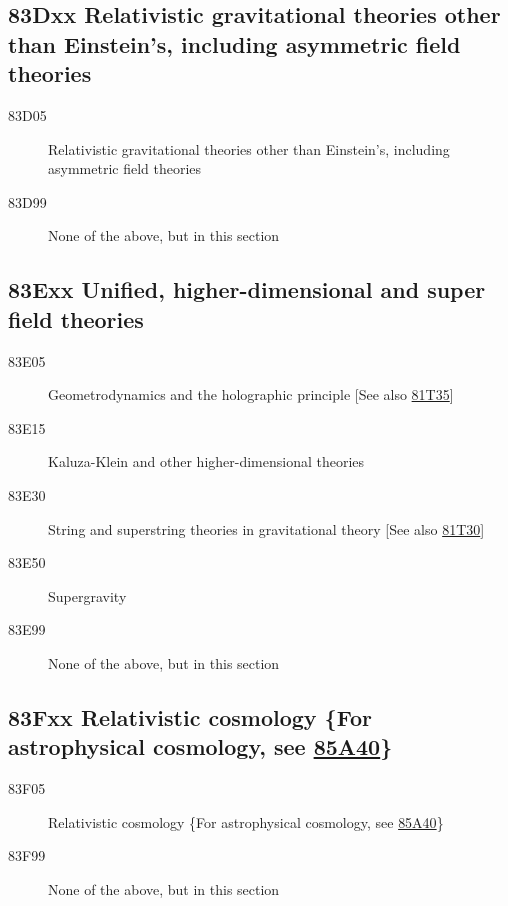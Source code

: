 \documentclass[letterpaper]{article}
\begin{document}
\subsection*{83Dxx  Relativistic gravitational theories other than Einstein's, including asymmetric field theories }\label{83Dxx}
\begin{description}  
\item [83D05]\label{83D05} Relativistic gravitational theories other than Einstein's, including asymmetric field theories
\item [83D99]\label{83D99} None of the above, but in this section
\end{description}
\subsection*{83Exx  Unified, higher-dimensional and super field theories }\label{83Exx}
\begin{description}  
\item [83E05]\label{83E05} Geometrodynamics and the holographic principle [See also \hyperref[81T35]{81T35}]
\item [83E15]\label{83E15} Kaluza-Klein and other higher-dimensional theories
\item [83E30]\label{83E30} String and superstring theories in gravitational theory [See also \hyperref[81T30]{81T30}]
\item [83E50]\label{83E50} Supergravity
\item [83E99]\label{83E99} None of the above, but in this section
\end{description}
\subsection*{83Fxx  Relativistic cosmology \{For astrophysical cosmology, see \hyperref[85A40]{85A40}\} }\label{83Fxx}
\begin{description}  
\item [83F05]\label{83F05} Relativistic cosmology \{For astrophysical cosmology, see \hyperref[85A40]{85A40}\}
\item [83F99]\label{83F99} None of the above, but in this section
\end{description}
\end{document}
